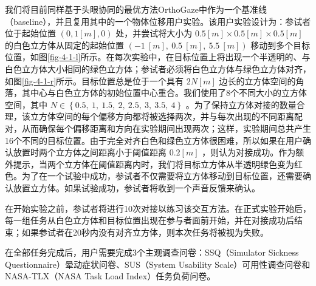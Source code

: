 我们将目前同样基于头眼协同的最优方法OrthoGaze中作为一个基准线（baseline），并且复用其中的一个物体位移用户实验。该用户实验设计为：参试者位于起始位置 $(0, 1[m], 0)$ 处，并尝试将大小为 $0.5[m] \times 0.5[m] \times 0.5[m]$ 的白色立方体从固定的起始位置 $\left(-1\ \left[m\right],\ 0.5\ \left[m\right],\ 5.5\ \left[m\right]\right)$ 移动到多个目标位置，如图\ref{fig-4-1-l}所示。在每次实验中，在目标位置上将出现一个半透明的、与白色立方体大小相同的绿色立方体；参试者必须将白色立方体与绿色立方体对齐，如图\ref{fig-4-1-r}所示。目标位置总是位于一个具有 $2N\left[m\right]$ 边长的立方体空间的角落，其中心与白色立方体的初始位置中心重合。我们使用了8个不同大小的立方体空间，其中 $N \in \left\{0.5,\ 1,\ 1.5,\ 2,\ 2.5,\ 3,\ 3.5,\ 4\right\}$ 。为了保持立方体对接的数量合理，该立方体空间的每个偏移方向都将被选择两次，并与每次出现的不同距离配对，从而确保每个偏移距离和方向在实验期间出现两次；这样，实验期间总共产生16个不同的目标位置。由于完全对齐白色和绿色立方体很困难，所以如果在用户确认放置时两个立方体之间距离小于阈值距离 $0.2\left[m\right]$ ，则认为对接成功。作为额外提示，当两个立方体在阈值距离内时，我们将目标立方体从半透明绿色变为红色。为了在一个试验中成功，参试者不仅需要将立方体移动到目标位置，还需要确认放置立方体。如果试验成功，参试者将收到一个声音反馈来确认。

在开始实验之前，参试者将进行10次对接以练习该交互方法。在正式实验开始后，每一组任务从白色立方体和目标位置出现在参与者面前开始，并在对接成功后结束；如果参试者在20秒内没有对齐立方体，则本次任务将被视为失败。

在全部任务完成后，用户需要完成3个主观调查问卷：SSQ（Simulator Sickness Questionnaire）晕动症状问卷、SUS（System Usability Scale）可用性调查问卷和NASA-TLX（NASA Task Load Index）任务负荷问卷。

